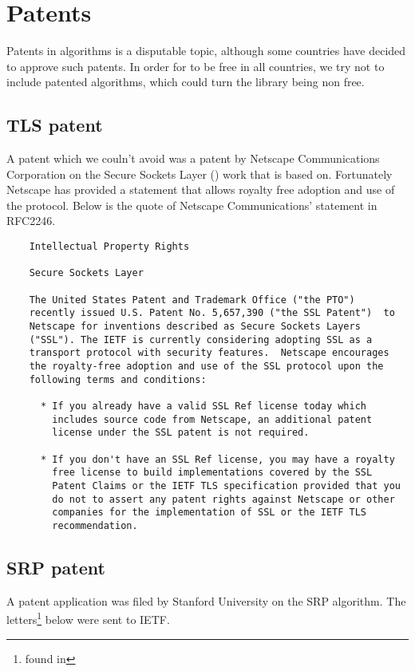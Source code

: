 \chapter{Patents}
\label{ap:patents}
Patents in algorithms is a disputable topic, although some countries have 
decided to approve such patents. In order for \gnutls{} to be free in all
countries, we try not to include patented algorithms, which could turn the 
library being non free.

\section{TLS patent}
A patent which we couln't avoid was a patent by Netscape Communications 
Corporation on the Secure Sockets Layer (\ssl{}) work that \tlsI{} is based on.
Fortunately Netscape has provided a statement that allows royalty free 
adoption and use of the \ssl{} protocol. Below is the quote of Netscape 
Communications' statement in RFC2246\cite{RFC2246}.

\begin{verbatim}
    Intellectual Property Rights

    Secure Sockets Layer

    The United States Patent and Trademark Office ("the PTO")
    recently issued U.S. Patent No. 5,657,390 ("the SSL Patent")  to
    Netscape for inventions described as Secure Sockets Layers
    ("SSL"). The IETF is currently considering adopting SSL as a
    transport protocol with security features.  Netscape encourages
    the royalty-free adoption and use of the SSL protocol upon the
    following terms and conditions:

      * If you already have a valid SSL Ref license today which
        includes source code from Netscape, an additional patent
        license under the SSL patent is not required.

      * If you don't have an SSL Ref license, you may have a royalty
        free license to build implementations covered by the SSL
        Patent Claims or the IETF TLS specification provided that you
        do not to assert any patent rights against Netscape or other
        companies for the implementation of SSL or the IETF TLS
        recommendation.
\end{verbatim}

\section{SRP patent}
A patent application was filed by Stanford University on the SRP algorithm.
The letters\footnote{found in } below were sent to IETF.

